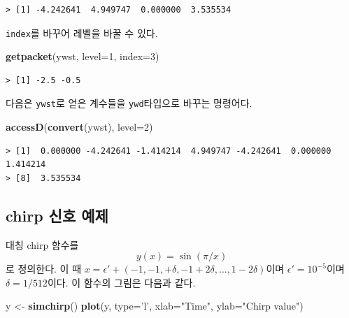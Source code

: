 \documentclass[b5paper,]{scrbook}
\makeatletter
\newenvironment{Shaded}{\begin{snugshade}}{\end{snugshade}}
\newcommand{\KeywordTok}[1]{\textcolor[rgb]{0.13,0.29,0.53}{\textbf{{#1}}}}
\newcommand{\DataTypeTok}[1]{\textcolor[rgb]{0.13,0.29,0.53}{{#1}}}
\newcommand{\DecValTok}[1]{\textcolor[rgb]{0.00,0.00,0.81}{{#1}}}
\newcommand{\StringTok}[1]{\textcolor[rgb]{0.31,0.60,0.02}{{#1}}}
\newcommand{\NormalTok}[1]{{#1}}
\theoremstyle{plain}
\theoremstyle{definition}
\numberwithin{equation}{section}
\newenvironment{kframe}{%
\medskip{}
\setlength{\fboxsep}{.8em}
 \def\at@end@of@kframe{}%
 \ifinner\ifhmode%
  \def\at@end@of@kframe{\end{minipage}}%
  \begin{minipage}{\columnwidth}%
 \fi\fi%
 \def\FrameCommand##1{\hskip\@totalleftmargin \hskip-\fboxsep
 \colorbox{shadecolor}{##1}\hskip-\fboxsep
     \hskip-\linewidth \hskip-\@totalleftmargin \hskip\columnwidth}%
 \MakeFramed {\advance\hsize-\width
   \@totalleftmargin\z@ \linewidth\hsize
   \@setminipage}}%
 {\par\unskip\endMakeFramed%
 \at@end@of@kframe}
\renewenvironment{Shaded}{\begin{kframe}}{\end{kframe}}
\makeatother
\begin{document}
\begin{verbatim}
> [1] -4.242641  4.949747  0.000000  3.535534
\end{verbatim}

\texttt{index}를 바꾸어 레벨을 바꿀 수 있다.

\begin{Shaded}
\begin{Highlighting}[]
\KeywordTok{getpacket}\NormalTok{(ywst, }\DataTypeTok{level=}\DecValTok{1}\NormalTok{, }\DataTypeTok{index=}\DecValTok{3}\NormalTok{)}
\end{Highlighting}
\end{Shaded}

\begin{verbatim}
> [1] -2.5 -0.5
\end{verbatim}

다음은 \texttt{ywst}로 얻은 계수들을 \texttt{ywd}타입으로 바꾸는
명령어다.

\begin{Shaded}
\begin{Highlighting}[]
\KeywordTok{accessD}\NormalTok{(}\KeywordTok{convert}\NormalTok{(ywst), }\DataTypeTok{level=}\DecValTok{2}\NormalTok{)}
\end{Highlighting}
\end{Shaded}

\begin{verbatim}
> [1]  0.000000 -4.242641 -1.414214  4.949747 -4.242641  0.000000  1.414214
> [8]  3.535534
\end{verbatim}

\subsection{chirp 신호 예제}\label{chirp--}

대칭 chirp 함수를 \[y(x)=\sin(\pi/x)\] 로 정의한다. 이 때
\(x=\epsilon ' +(-1,-1,+\delta,-1+2\delta, \ldots, 1-2\delta)\)이며
\(\epsilon ' =10^{-5}\)이며 \(\delta=1/512\)이다. 이 함수의 그림은
다음과 같다.

\begin{Shaded}
\begin{Highlighting}[]
\NormalTok{y <-}\StringTok{ }\KeywordTok{simchirp}\NormalTok{()}
\KeywordTok{plot}\NormalTok{(y, }\DataTypeTok{type=}\StringTok{'l'}\NormalTok{, }\DataTypeTok{xlab=}\StringTok{"Time"}\NormalTok{, }\DataTypeTok{ylab=}\StringTok{"Chirp value"}\NormalTok{)}
\end{Highlighting}
\end{Shaded}
\end{document}
